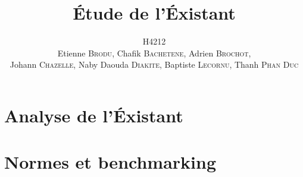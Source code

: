 \documentclass[a4paper,11pt]{report}
\title{\'Etude de l'\'Existant}
\author{H4212\\Etienne \textsc{Brodu}, Chafik \textsc{Bachetene}, Adrien \textsc{Brochot},\\Johann \textsc{Chazelle}, Naby Daouda \textsc{Diakite}, Baptiste \textsc{Lecornu}, Thanh \textsc{Phan Duc}}
\begin{document}
\maketitle
\newpage

\tableofcontents
\newpage

\part{Analyse de l'\'Existant}
    

\part{Normes et benchmarking}
    

    
\end{document}
